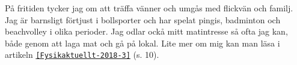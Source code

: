 


\begin{cvparagraph}
P{\aa} fritiden tycker jag om att tr{\"a}ffa v{\"a}nner och umg{\aa}s med flickv{\"a}n och familj.
Jag {\"a}r barnsligt f{\"o}rtjust i bollsporter och har spelat pingis, badminton och beachvolley i olika perioder.
Jag odlar ock{\aa} mitt matintresse s{\aa} ofta jag kan, b{\aa}de genom att laga mat och g{\aa} p{\aa} lokal.
Lite mer om mig kan man l{\"a}sa i artikeln \href{http://www.fysikersamfundet.se/wp-content/uploads/Fysikaktuellt3-18_Webb.pdf}{\texttt{[Fysikaktuellt-2018-3]}} (s. 10).
\end{cvparagraph}